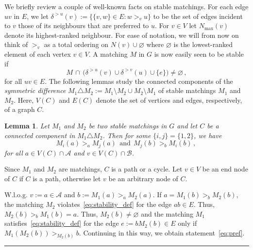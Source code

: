 \documentclass[3p,times]{elsarticle}
\newtheorem{lemma}[fact]{Lemma}
\newenvironment{proof}{{\bf Proof:  }}{\hfill\rule{2mm}{2mm}}
\newcommand{\cA}{\mathcal{A}} \newcommand{\cB}{\mathcal{B}}
\begin{document}
We briefly review a couple of well-known facts on stable matchings. 
For each edge $uv$ in $E$, we let
$\delta^{>u}(v):=\{ \{v,w\}\in E: w >_v u \}$ to be the set of edges
incident to $v$ those of its neighbours that are preferred to $u$. 
For $v \in V$ let $N_{\max}(v)$ denote its highest-ranked neighbour. 
For ease of notation, we will from now on think of $>_v$ as a total
ordering on $N(v) \cup \varnothing$ where 
$\varnothing$ is the lowest-ranked element of each vertex $v \in V$. 
A matching $M$ in $G$ is now easily seen to be stable if 
\begin{equation}\label{eq:stability_def}
		M \, \cap \, \big(\delta^{>u}(v) \cup \delta^{>v}(u) \cup  \{e\} \big)\neq\varnothing\,,
\end{equation}
for all $uv \in E$. The following lemmas study the connected components of
the {\em symmetric difference} $M_1\triangle M_2:=M_1\setminus M_2
\cup M_2 \setminus M_1$ of 
stable matchings $M_1$ and $M_2$. Here, $V(C)$ and $E(C)$ denote
the set of vertices and edges, respectively, of a graph $C$.

\begin{lemma}\label{lemma:pref}
Let $M_1$ and $M_2$ be two stable matchings in $G$ and let $C$ be a
connected component in $M_1 \triangle M_2$. Then for some
$\{i,j\}=\{1,2\}$, we have
\begin{equation}\label{eq:pref}
	M_i(a)>_a M_j(a) ~~\text{and} ~~  M_j(b)>_b M_i(b)\,,\,
\end{equation}
for all $a \in V(C) \cap \cA$ and $v \in V(C) \cap \cB$.
\end{lemma}
\begin{proof}
  Since $M_1$ and $M_2$ are matchings, $C$ is a path or a cycle. Let
  $v\in V$ be an end node of $C$ if $C$ is a path, otherwise let $v$
  be an arbitrary node of $C$.

  W.l.o.g. $v:=a\in \mathcal{A}$ and $b:=M_1(a) >_a M_2(a)$. If
  $a=M_1(b) >_b M_2(b)$, the matching $M_2$
  violates~\eqref{eq:stability_def} for the edge $ab\in E$. Thus,
  $M_2(b) >_b M_1(b)=a$. Thus, $M_2(b)\neq \varnothing$ and the
  matching $M_1$ satisfies~\eqref{eq:stability_def} for the edge
  $e:=bM_2(b)\in E$ only if $M_1(M_2(b))>_{M_2(b)} b$. Continuing
  in this way, we obtain statement~\eqref{eq:pref}.
\end{proof}
\end{document}
